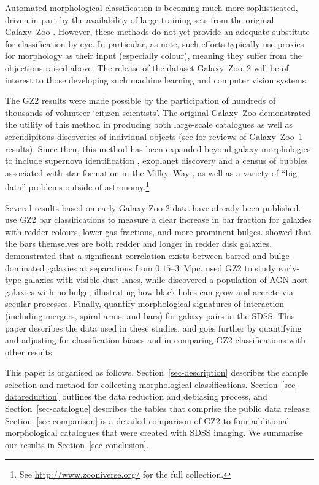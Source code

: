 \documentclass[useAMS,usenatbib]{mn2e}
\begin{document}
Automated morphological classification is becoming much more sophisticated, driven in part by the availability of large training sets from the original Galaxy~Zoo \citep{ban10,hue11,dav13}. However, these methods do not yet provide an adequate substitute for classification by eye. In particular, as \citet{lin11} note, such efforts typically use proxies for morphology as their input (especially colour), meaning they suffer from the objections raised above. The release of the dataset Galaxy~Zoo~2 will be of interest to those developing such machine learning and computer vision systems. 

The GZ2 results were made possible by the participation of hundreds of thousands of volunteer `citizen scientists'. The original Galaxy~Zoo demonstrated the utility of this method in producing both large-scale catalogues as well as serendipitous discoveries of individual objects (see \citealt{lin11,for12} for reviews of Galaxy~Zoo~1 results). Since then, this method has been expanded beyond galaxy morphologies to include supernova identification \citep{smi11}, exoplanet discovery \citep{fis12,sch12} and a census of bubbles associated with star formation in the Milky~Way \citep{sim12a,ken12}, as well as a variety of ``big data'' problems outside of astronomy.\footnote{See \url{http://www.zooniverse.org/} for the full collection.} 

Several results based on early Galaxy Zoo 2 data have already been published. \citet{mas11c,mas12a} use GZ2 bar classifications to measure a clear increase in bar fraction for galaxies with redder colours, lower gas fractions, and more prominent bulges. \citet{hoy11} showed that the bars themselves are both redder and longer in redder disk galaxies. \citet{ski12} demonstrated that a significant correlation exists between barred and bulge-dominated galaxies at separations from $0.15$--$3$~Mpc. \citet{kav12a} used GZ2 to study early-type galaxies with visible dust lanes, while \citet{sim13} discovered a population of AGN host galaxies with no bulge, illustrating how black holes can grow and accrete via secular processes. Finally, \citet{cas13} quantify morphological signatures of interaction (including mergers, spiral arms, and bars) for galaxy pairs in the SDSS. This paper describes the data used in these studies, and goes further by quantifying and adjusting for classification biases and in comparing GZ2 classifications with other results. 

This paper is organised as follows. Section~\ref{sec-description} describes the sample selection and method for collecting morphological classifications. Section~\ref{sec-datareduction} outlines the data reduction and debiasing process, and Section~\ref{sec-catalogue} describes the tables that comprise the public data release. Section~\ref{sec-comparison} is a detailed comparison of GZ2 to four additional morphological catalogues that were created with SDSS imaging. We summarise our results in Section~\ref{sec-conclusion}. 
\end{document}
